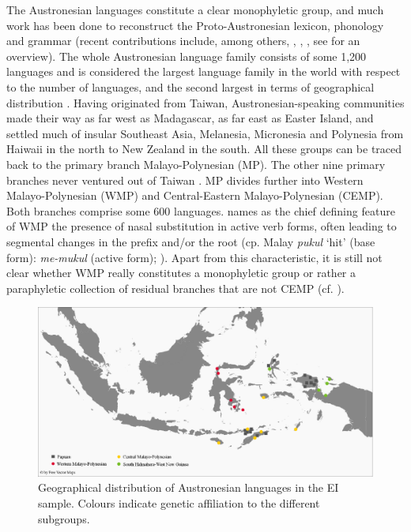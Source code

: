 The Austronesian languages constitute a clear monophyletic group, and much work has been done to reconstruct the Proto-Austronesian lexicon, phonology and grammar (recent contributions include, among others, \citealt{Tryon1995}, \citealt{wouk2002history}, \citealt{blust2009austronesian}, see \citealt{adelaar2005austronesian} for an overview). The whole Austronesian language family consists of some 1,200 languages and is considered the largest language family in the world with respect to the number of languages, and the second largest in terms of geographical distribution \citep{adelaar2005austronesian}. Having originated from Taiwan, Austronesian-speaking communities made their way as far west as Madagascar, as far east as Easter Island, and settled much of insular Southeast Asia, Melanesia, Micronesia and Polynesia from Haiwaii in the north to New Zealand in the south. All these groups can be traced back to the primary branch Malayo-Polynesian (MP). The other nine primary branches never ventured out of Taiwan \citep{blust2009austronesian}. MP divides further into Western Malayo-Polynesian (WMP) and Central-Eastern Malayo-Polynesian (CEMP). Both branches comprise some 600 languages. \citet{blust2009austronesian} names as the chief defining feature of WMP the presence of nasal substitution in active verb forms, often leading to segmental changes in the prefix and/or the root (cp. Malay \textit{pukul} `hit' (base form): \textit{me-mukul} (active form); \citealt[30]{blust2009austronesian}). Apart from this characteristic, it is still not clear whether WMP really constitutes a monophyletic group or rather a paraphyletic collection of residual branches that are not CEMP (cf. \citealt[30]{blust2009austronesian}). 

\begin{figure}
\includegraphics[width=\columnwidth]{figures/Map_overview_klein_Austroaff.eps}
\caption[Geographical distribution of Austronesian languages in the sample]{Geographical distribution of Austronesian languages in the EI sample. Colours indicate genetic affiliation to the different subgroups.}\label{map:Austro1}
\end{figure}

